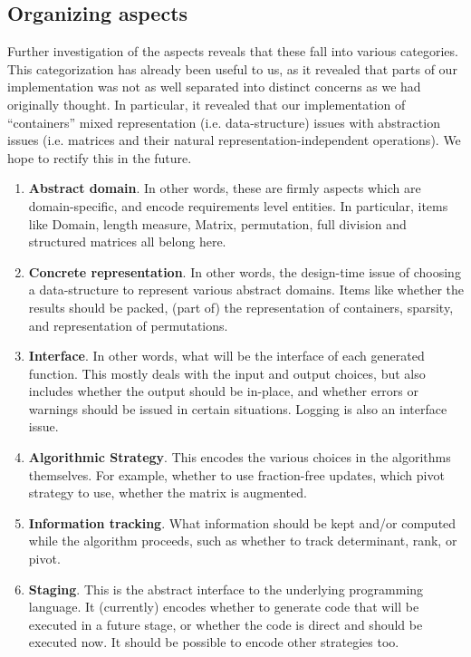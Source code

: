 \documentclass[draft]{elsart}
\begin{document}
\subsection{Organizing aspects}

Further investigation of the aspects reveals that these fall into
various categories.  This categorization has already been useful to us,
as it revealed that parts of our implementation was not as well
separated into distinct concerns as we had originally thought.  In
particular, it revealed that our implementation of ``containers'' 
mixed representation (i.e. data-structure) issues with abstraction
issues (i.e. matrices and their natural representation-independent
operations).  We hope to rectify this in the future.

\begin{enumerate}
	\item \textbf{Abstract domain}.  In other words, these are
		firmly aspects which are domain-specific, and encode
		requirements level entities.  In particular, items like
		Domain, length measure, Matrix, permutation, full division
		and structured matrices all belong here.
	\item \textbf{Concrete representation}.  In other words, the
		design-time issue of choosing a data-structure to represent
		various abstract domains.  Items like whether the results 
		should be packed, (part of) the representation of containers,
		sparsity, and representation of permutations.
	\item \textbf{Interface}.  In other words, what will be the
		interface of each generated function.  This mostly deals
		with the input and output choices, but also includes whether
		the output should be in-place, and whether errors or warnings
		should be issued in certain situations.  Logging is also
		an interface issue.
	\item \textbf{Algorithmic Strategy}.  This encodes the various
		choices in the algorithms themselves.  For example, whether
		to use fraction-free updates, which pivot strategy to use,
		whether the matrix is augmented.
	\item \textbf{Information tracking}.  What information should be
		kept and/or computed while the algorithm proceeds, such
		as whether to track determinant, rank, or pivot.
	\item \textbf{Staging}.  This is the abstract interface to the
		underlying programming language.  It (currently) encodes
		whether to generate code that will be executed in a future
		stage, or whether the code is direct and should be executed
		now.  It should be possible to encode other strategies too.
\end{enumerate}
\end{document}
